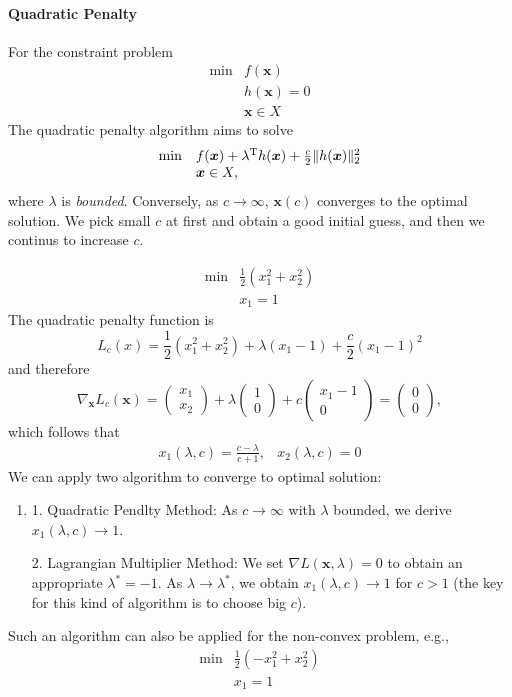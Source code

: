 \paragraph{Quadratic Penalty}
For the constraint problem
\[
\begin{array}{ll}
\min&f(\bm x)\\
&h(\bm x)=0\\
&\bm x\in X
\end{array}
\]
The quadratic penalty algorithm aims to solve
\[
\begin{array}{ll}
\min&f(\bm x)+\lambda^{\mathrm T} h(\bm x)+\frac{c}{2}\|h(\bm x)\|_2^2\\
&\bm x\in X,
\end{array}
\]
where $\lambda$ is \emph{bounded}. Conversely, as $c\to\infty$, $\bm x(c)$ converges to the optimal solution. We pick small $c$ at first and obtain a good initial guess, and then we continus to increase $c$.
\begin{example}
\[
\begin{array}{ll}
\min&\frac{1}{2}(x_1^2+x_2^2)\\
&x_1=1
\end{array}
\]
The quadratic penalty function is 
\[
L_c(x)=\frac{1}{2}(x_1^2+x_2^2) + \lambda(x_1-1)+\frac{c}{2}(x_1-1)^2
\]
and therefore
\[
\nabla_{\bm x}L_c(\bm x)=\begin{pmatrix}
x_1\\x_2
\end{pmatrix}+\lambda\begin{pmatrix}
1\\0
\end{pmatrix}+c\begin{pmatrix}
x_1-1\\0
\end{pmatrix}=\begin{pmatrix}
0\\0
\end{pmatrix},
\]
which follows that
\[
\begin{array}{ll}
x_1(\lambda,c)=\frac{c-\lambda}{c+1},
&
x_2(\lambda,c)=0
\end{array}
\]
We can apply two algorithm to converge to optimal solution:
\begin{enumerate}
\item
1. 
Quadratic Pendlty Method:
As $c\to\infty$ with $\lambda$ bounded, we derive $x_1(\lambda,c)\to1$.
\item[2.]
Lagrangian Multiplier Method: 
We set $\nabla L(\bm x,\lambda)=0$ to obtain an appropriate $\lambda^*=-1$. As $\lambda\to\lambda^*$, we obtain $x_1(\lambda,c)\to1$ for $c>1$ (the key for this kind of algorithm is to choose big $c$).
\end{enumerate}
\end{example}
Such an algorithm can also be applied for the non-convex problem, e.g.,
\[
\begin{array}{ll}
\min&\frac{1}{2}(-x_1^2+x_2^2)\\
&x_1=1
\end{array}
\]













